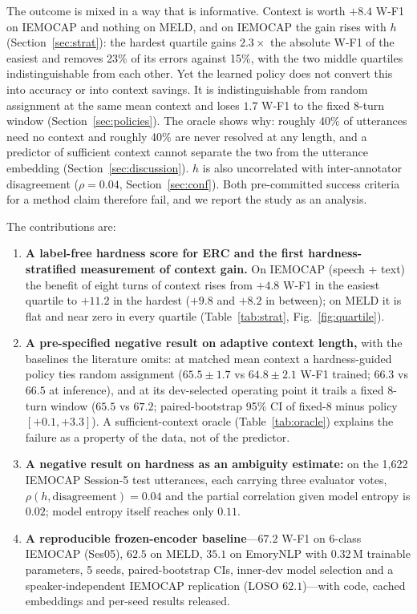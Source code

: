 \documentclass[journal]{IEEEtran}
\newcommand{\wf}{W-F1}
\begin{document}
The outcome is mixed in a way that is informative. Context is worth $+8.4$ \wf{} on IEMOCAP and nothing on MELD, and on IEMOCAP the gain rises with $h$ (Section~\ref{sec:strat}): the hardest quartile gains $2.3\times$ the absolute \wf{} of the easiest and removes 23\% of its errors against 15\%, with the two middle quartiles indistinguishable from each other. Yet the learned policy does not convert this into accuracy or into context savings. It is indistinguishable from random assignment at the same mean context and loses $1.7$ \wf{} to the fixed 8-turn window (Section~\ref{sec:policies}). The oracle shows why: roughly 40\% of utterances need no context and roughly 40\% are never resolved at any length, and a predictor of sufficient context cannot separate the two from the utterance embedding (Section~\ref{sec:discussion}). $h$ is also uncorrelated with inter-annotator disagreement ($\rho = 0.04$, Section~\ref{sec:conf}). Both pre-committed success criteria for a method claim therefore fail, and we report the study as an analysis.

The contributions are:
\begin{enumerate}
\item \textbf{A label-free hardness score for ERC and the first hardness-stratified measurement of context gain.} On IEMOCAP (speech + text) the benefit of eight turns of context rises from $+4.8$ \wf{} in the easiest quartile to $+11.2$ in the hardest ($+9.8$ and $+8.2$ in between); on MELD it is flat and near zero in every quartile (Table~\ref{tab:strat}, Fig.~\ref{fig:quartile}).
\item \textbf{A pre-specified negative result on adaptive context length,} with the baselines the literature omits: at matched mean context a hardness-guided policy ties random assignment ($65.5 \pm 1.7$ vs $64.8 \pm 2.1$ \wf{} trained; $66.3$ vs $66.5$ at inference), and at its dev-selected operating point it trails a fixed 8-turn window ($65.5$ vs $67.2$; paired-bootstrap 95\% CI of fixed-8 minus policy $[+0.1, +3.3]$). A sufficient-context oracle (Table~\ref{tab:oracle}) explains the failure as a property of the data, not of the predictor.
\item \textbf{A negative result on hardness as an ambiguity estimate:} on the 1{,}622 IEMOCAP Session-5 test utterances, each carrying three evaluator votes, $\rho(h,\text{disagreement}) = 0.04$ and the partial correlation given model entropy is $0.02$; model entropy itself reaches only $0.11$.
\item \textbf{A reproducible frozen-encoder baseline}---$67.2$ \wf{} on 6-class IEMOCAP (Ses05), $62.5$ on MELD, $35.1$ on EmoryNLP with 0.32\,M trainable parameters, 5 seeds, paired-bootstrap CIs, inner-dev model selection and a speaker-independent IEMOCAP replication (LOSO $62.1$)---with code, cached embeddings and per-seed results released.
\end{enumerate}
\end{document}
